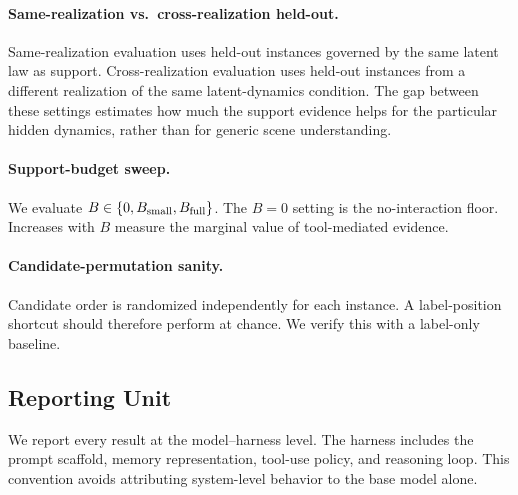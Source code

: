 \paragraph{Same-realization vs.\ cross-realization held-out.} Same-realization evaluation uses held-out instances governed by the same latent law as support. Cross-realization evaluation uses held-out instances from a different realization of the same latent-dynamics condition. The gap between these settings estimates how much the support evidence helps for the particular hidden dynamics, rather than for generic scene understanding.

\paragraph{Support-budget sweep.} We evaluate $B \in \{0,B_{\rm small},B_{\rm full}\}$. The $B=0$ setting is the no-interaction floor. Increases with $B$ measure the marginal value of tool-mediated evidence.

\paragraph{Candidate-permutation sanity.} Candidate order is randomized independently for each instance. A label-position shortcut should therefore perform at chance. We verify this with a label-only baseline.

\subsection{Reporting Unit}

We report every result at the model--harness level. The harness includes the prompt scaffold, memory representation, tool-use policy, and reasoning loop. This convention avoids attributing system-level behavior to the base model alone.
